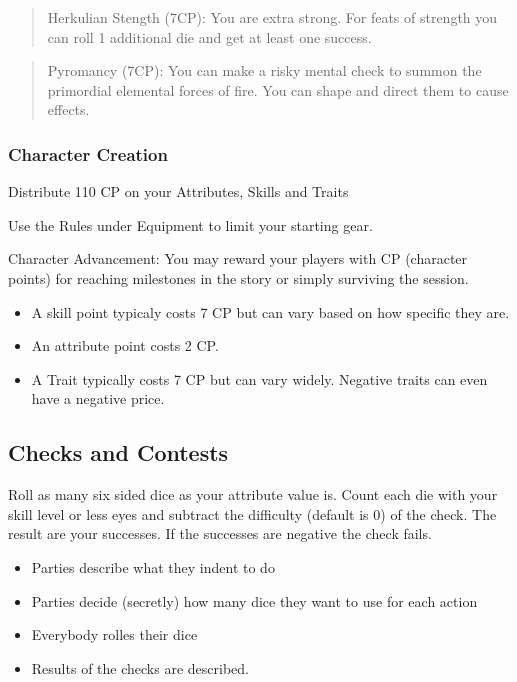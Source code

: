 \documentclass[11pt]{article}
\begin{document}
{\begin{multicols}{2}[]
\begin{quote}
Herkulian Stength (7CP):
You are extra strong. For feats of strength you can roll 1 additional die and get at least one success.
\end{quote}

\begin{quote}
Pyromancy (7CP):
You can make a risky mental check to summon the primordial elemental forces of fire. You can shape and direct them to cause effects. 
\end{quote}

\subsubsection{Character Creation}
\label{sec:org52956c8}
Distribute 110 CP on your Attributes, Skills and Traits

Use the Rules under Equipment to limit your starting gear.

Character Advancement:
You may reward your players with CP (character points) for reaching milestones in the story or simply surviving the session.

\begin{itemize}
\item A skill point typicaly costs 7 CP but can vary based on how specific they are.
\item An attribute point costs 2 CP.
\item A Trait typically costs 7 CP but can vary widely. Negative traits can even have a negative price.
\end{itemize}

\subsection{Checks and Contests}
\label{sec:org06f1f9d}
Roll as many six sided dice as your attribute value is. Count each die with your skill level or less eyes and subtract the difficulty (default is 0) of the check. The result are your successes. If the successes are negative the check fails.

\begin{itemize}
\item Parties describe what they indent to do
\item Parties decide (secretly) how many dice they want to use for each action
\item Everybody rolles their dice
\item Results of the checks are described.
\end{itemize}


\end{multicols}}
\end{document}
